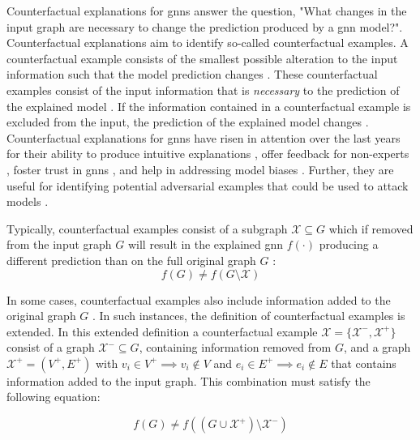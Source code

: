 Counterfactual explanations for \glspl{gnn} answer the question, "What changes in the input graph are necessary to change the prediction produced by a \gls{gnn} model?". Counterfactual explanations aim to identify so-called counterfactual examples. A counterfactual example consists of the smallest possible alteration to the input information such that the model prediction changes \cite{kakkad_survey_2023}. These counterfactual examples consist of the input information that is \textit{necessary} to the prediction of the explained model \cite{tan_learning_2022}. If the information contained in a counterfactual example is excluded from the input, the prediction of the explained model changes \cite{tan_learning_2022}. Counterfactual explanations for \glspl{gnn} have risen in attention over the last years \cite{ma_clear_2022} for their ability to produce intuitive explanations \cite{ma_clear_2022}, offer feedback for non-experts \cite{prado-romero_survey_2023}, foster trust in \glspl{gnn} \cite{prado-romero_survey_2023}, and help in addressing model biases \cite{prado-romero_survey_2023}. Further, they are useful for identifying potential adversarial examples that could be used to attack models \cite{lucic_cf-gnnexplainer_2022}.

Typically, counterfactual examples consist of a subgraph $\mathcal{X} \subseteq G$ which if removed from the input graph $G$ will result in the explained \gls{gnn} $f(\cdot)$ producing a different prediction than on the full original graph $G$ \cite{tan_learning_2022}:
\begin{equation}
    \label{e_cf_explanation}
    f(G) \neq f(G\setminus \mathcal{X})
\end{equation}

In some cases, counterfactual examples also include information added to the original graph $G$ \cite{abrate_counterfactual_2021}. In such instances, the definition of counterfactual examples is extended. In this extended definition a counterfactual example $\mathcal{X} = \{\mathcal{X}^-, \mathcal{X}^+\}$ consist of a graph $\mathcal{X}^- \subseteq G$, containing information removed from $G$, and a graph $\mathcal{X}^+ = (V^+, E^+)$ with ${v_i \in V^+ \implies v_i \notin V}$ and $e_i \in E^+ \implies e_i \notin E$ that contains information added to the input graph. This combination must satisfy the following equation:

\begin{equation}
    f(G) \neq f((G \cup \mathcal{X}^+) \setminus \mathcal{X^-})
\end{equation}

